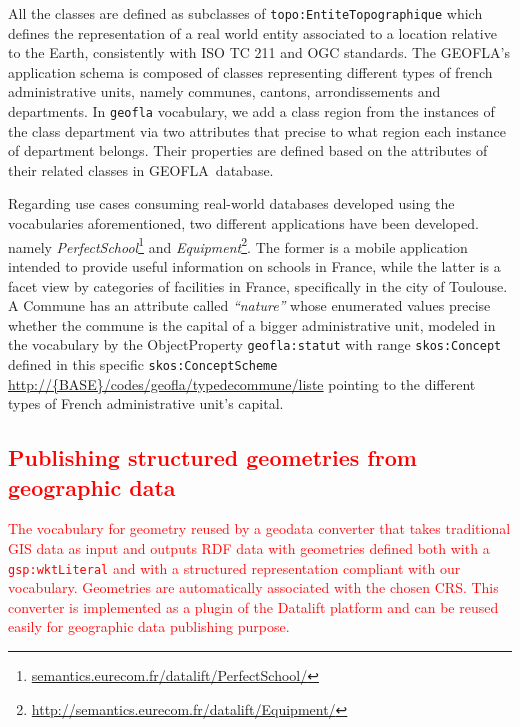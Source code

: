 All the classes are defined as subclasses of  \texttt{topo:EntiteTopographique} which defines the representation of a real world entity associated to a location relative to the Earth, consistently with ISO TC 211 and OGC standards. 
The GEOFLA\circledR 's application schema is composed of classes representing different types of french administrative units, namely communes, cantons, arrondissements and departments. In \texttt{geofla} vocabulary, we add a class region  from the instances of the class department via two attributes  that precise to what region each instance of department belongs.  Their properties are defined based on the attributes of their related classes in GEOFLA\circledR ~database.

Regarding use cases consuming  real-world databases developed using the vocabularies aforementioned, two different applications have been developed. namely \textit{PerfectSchool}\footnote{\url{semantics.eurecom.fr/datalift/PerfectSchool/}}  and \textit{Equipment}\footnote{\url{http://semantics.eurecom.fr/datalift/Equipment/}}. The former is a mobile application intended to provide useful information on schools in France, while the latter is a facet view by categories of facilities in France, specifically in the city of Toulouse. 
A Commune has an attribute called \textit{``nature''} whose enumerated values precise whether the commune is the capital of a bigger administrative unit, modeled in the vocabulary by the ObjectProperty \texttt{geofla:statut} with range \texttt{skos:Concept} defined in this specific \texttt{skos:ConceptScheme} \url{http://{BASE}/codes/geofla/typedecommune/liste} pointing to the different types of French administrative unit's capital. 

\textcolor{red}{
\subsection{Publishing structured geometries from geographic data}
The vocabulary for geometry reused by a geodata converter that takes traditional GIS data as input and outputs RDF data with geometries defined both with a \texttt{gsp:wktLiteral} and with a structured representation compliant with our vocabulary. Geometries are automatically associated with the chosen CRS. This converter is implemented as a plugin of the Datalift platform and can be reused easily for geographic data publishing purpose.
}
